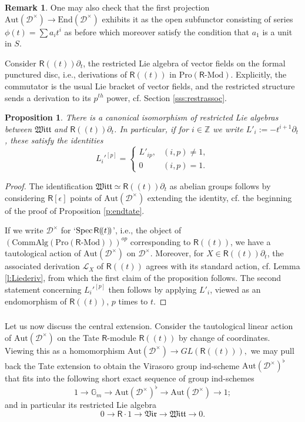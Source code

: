 \documentclass{amsart}
\newtheorem{Prop}[Thm]{Proposition}
\theoremstyle{definition}
\newtheorem{Rem}[Thm]{Remark}
\newcommand{\Pro}{\on{Pro}}
\newcommand{\sss}{\subsubsection{}}
\newcommand{\Spec}{\on{Spec}\hspace{.5mm}}
\newcommand{\D}{\sD}
\newcommand{\sD}{\mathscr{D}}
\renewcommand{\mod}{\text{-}\on{Mod}}
\newcommand{\on}{\mathrm}
\newcommand{\Ring}{\mathsf{R}}
\numberwithin{equation}{section}
\begin{document}
\begin{Rem} One may also check that the first projection $\on{Aut}(\D^{\times}) \rightarrow \on{End}(\D^{\times})$ exhibits it as the open subfunctor consisting of series $\phi(t) = \sum a_i t^i$ as before which moreover satisfy the condition that $a_1$ is a unit in $S$.  
\end{Rem}

Consider  $\Ring(\!(t)\!) \partial_t$, the restricted Lie algebra of vector fields on the formal punctured disc, i.e., derivations of $\Ring(\!(t)\!)$ in $\Pro(\Ring\mod)$. Explicitly, the commutator is the usual Lie bracket of vector fields, and the restricted structure sends a derivation to its $p^{th}$ power, cf. Section \ref{sss:restrassoc}. 

\begin{Prop} \label{p:wittrestr} There is a canonical isomorphism of restricted Lie algebras between $\mathfrak{Witt}$ and $\Ring(\!(t)\!)\partial_t$. In particular, if for $i \in \mathbb{Z}$ we write $L'_i := - t^{i+1} \partial_t$, these satisfy the identities $$L_i'^{[p]} = \begin{cases} L'_{ip}, & (i,p) \neq 1, \\ 0 & (i,p) = 1. \end{cases}$$
\end{Prop}


\begin{proof} The identification $\mathfrak{Witt} \simeq \Ring(\!(t)\!)\partial_t$ as abelian groups follows by considering $\Ring[\epsilon]$ points of $\on{Aut}(\D^\times)$ extending the identity,  cf. the beginning of the proof of Proposition \ref{p:endtate}. 


If we write $\D^{\times}$ for `$\Spec \Ring(\!(t)\!)$', i.e.,  the object of $(\on{CommAlg}(\Pro(\Ring\mod)))^{op}$ corresponding to $\Ring(\!(t)\!)$, we have a tautological action of $\on{Aut}(\D^{\times})$ on $\D^{\times}$. Moreover, for $X \in \Ring(\!(t)\!)\partial_t$, the associated derivation $\mathscr{L}_X$ of $\Ring(\!(t)\!)$ agrees with its standard action, cf. Lemma \ref{l:Liederiv}, from which the first claim of the proposition follows. The second statement concerning $L_i'^{[p]}$ then follows by applying $L'_i$, viewed as an endomorphism of $\Ring(\!(t)\!)$, $p$ times to  $t$. 
\end{proof}


\sss\label{SSS_Virasoro_pcenter} Let us now discuss the central extension. Consider the tautological linear action of $\on{Aut}(\D^\times)$ on the Tate $\Ring$-module $\Ring(\!(t)\!)$ by change of coordinates. Viewing this as a homomorphism $\on{Aut}(\D^\times) \rightarrow GL(\Ring(\!(t)\!)),$
we may pull back the Tate extension to obtain the Virasoro group ind-scheme {$\on{Aut}(\D^{\times})^\flat$ that fits} into the following short exact sequence of group ind-schemes
$$1 \rightarrow \mathbb{G}_m \rightarrow \on{Aut}(\D^{\times})^\flat \rightarrow \on{Aut}(\D^\times) \rightarrow 1;$$
and in particular its restricted Lie algebra
$$0 \rightarrow \Ring \cdot 1 \rightarrow \mathfrak{Vir} \rightarrow \mathfrak{Witt} \rightarrow 0.$$
\end{document}
